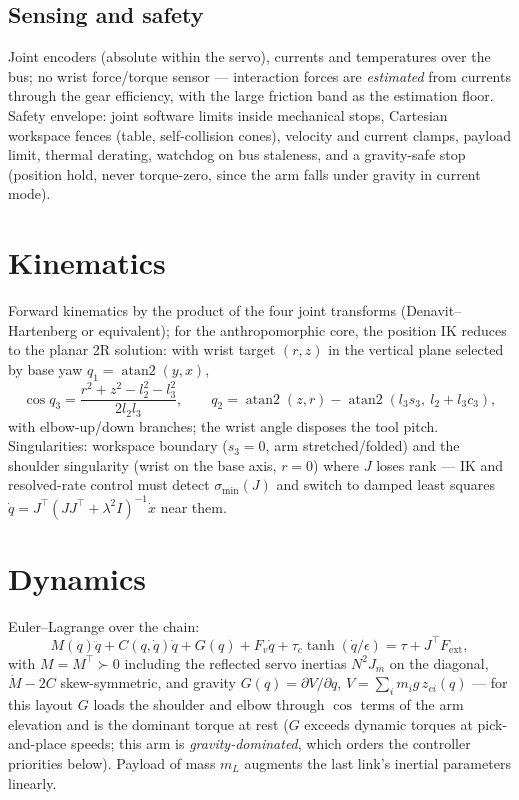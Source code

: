 \documentclass[conference]{IEEEtran}
\begin{document}
\subsection{Sensing and safety}
Joint encoders (absolute within the servo), currents and temperatures over the bus; no wrist force/torque sensor --- interaction forces are \emph{estimated} from currents through the gear efficiency, with the large friction band as the estimation floor. Safety envelope: joint software limits inside mechanical stops, Cartesian workspace fences (table, self-collision cones), velocity and current clamps, payload limit, thermal derating, watchdog on bus staleness, and a gravity-safe stop (position hold, never torque-zero, since the arm falls under gravity in current mode).

\section{Kinematics}
Forward kinematics by the product of the four joint transforms (Denavit--Hartenberg or equivalent); for the anthropomorphic core, the position IK reduces to the planar 2R solution: with wrist target $(r, z)$ in the vertical plane selected by base yaw $q_1 = \operatorname{atan2}(y, x)$,
\begin{equation}
\cos q_3 = \frac{r^2 + z^2 - l_2^2 - l_3^2}{2 l_2 l_3},\qquad
q_2 = \operatorname{atan2}(z, r) - \operatorname{atan2}(l_3 s_3,\ l_2 + l_3 c_3),
\end{equation}
with elbow-up/down branches; the wrist angle disposes the tool pitch. Singularities: workspace boundary ($s_3 = 0$, arm stretched/folded) and the shoulder singularity (wrist on the base axis, $r = 0$) where $J$ loses rank --- IK and resolved-rate control must detect $\sigma_{\min}(J)$ and switch to damped least squares $\dot q = J^{\!\top}(JJ^{\!\top} + \lambda^2 I)^{-1}\dot x$ near them.

\section{Dynamics}
Euler--Lagrange over the chain:
\begin{equation}
M(q)\ddot q + C(q,\dot q)\dot q + G(q) + F_v\dot q + \tau_c\tanh(\dot q/\epsilon) = \tau + J^{\!\top}F_{\mathrm{ext}},
\label{eq:armdyn}
\end{equation}
with $M = M^{\!\top}\succ0$ including the reflected servo inertias $N^2J_m$ on the diagonal, $\dot M - 2C$ skew-symmetric, and gravity
$G(q) = \partial V/\partial q$, $V = \sum_i m_i g\, z_{ci}(q)$ --- for this layout $G$ loads the shoulder and elbow through $\cos$ terms of the arm elevation and is the dominant torque at rest ($G$ exceeds dynamic torques at pick-and-place speeds; this arm is \emph{gravity-dominated}, which orders the controller priorities below). Payload of mass $m_L$ augments the last link's inertial parameters linearly.
\end{document}
